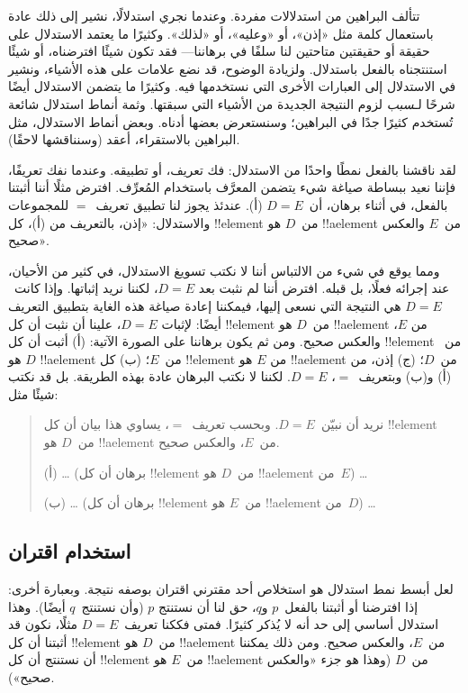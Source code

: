 \documentclass[../../../include/open-logic-section]{subfiles}
\begin{document}


تتألف البراهين من استدلالات مفردة. وعندما نجري استدلالًا، نشير إلى
ذلك عادة باستعمال كلمة مثل «إذن»، أو «وعليه»، أو «لذلك». وكثيرًا ما
يعتمد الاستدلال على حقيقة أو حقيقتين متاحتين لنا سلفًا في برهاننا---
فقد تكون شيئًا افترضناه، أو شيئًا استنتجناه بالفعل باستدلال. ولزيادة
الوضوح، قد نضع علامات على هذه الأشياء، ونشير في الاستدلال إلى
العبارات الأخرى التي نستخدمها فيه. وكثيرًا ما يتضمن الاستدلال أيضًا
شرحًا لـ\emph{سبب} لزوم النتيجة الجديدة من الأشياء التي سبقتها. وثمة
أنماط استدلال شائعة تُستخدم كثيرًا جدًا في البراهين؛ وسنستعرض بعضها
أدناه. وبعض أنماط الاستدلال، مثل البراهين بالاستقراء، أعقد (وسنناقشها
لاحقًا).

لقد ناقشنا بالفعل نمطًا واحدًا من الاستدلال: فك تعريف، أو تطبيقه.
وعندما نفك تعريفًا، فإننا نعيد ببساطة صياغة شيء يتضمن المعرَّف
باستخدام المُعرِّف. افترض مثلًا أننا أثبتنا بالفعل، في أثناء برهان،
أن~$D = E$ (أ). عندئذ يجوز لنا تطبيق تعريف~$=$ للمجموعات والاستدلال:
«إذن، بالتعريف من (أ)، كل !!{element} من~$D$ هو !!a{element} من~$E$
والعكس صحيح».

ومما يوقع في شيء من الالتباس أننا لا نكتب تسويغ الاستدلال، في كثير
من الأحيان، عند إجرائه فعلًا، بل قبله. افترض أننا لم نثبت بعد
$D = E$، لكننا نريد إثباتها. وإذا كانت~$D = E$ هي النتيجة التي نسعى
إليها، فيمكننا إعادة صياغة هذه الغاية بتطبيق التعريف أيضًا: لإثبات
$D = E$، علينا أن نثبت أن كل !!{element} من~$D$ هو !!a{element} من
$E$، والعكس صحيح. ومن ثم يكون برهاننا على الصورة الآتية: (أ) أثبت أن
كل !!{element} من~$D$ هو !!a{element} من~$E$؛ (ب) كل !!{element} من
$E$ هو !!a{element} من~$D$؛ (ج) إذن، من (أ) و(ب) وبتعريف~$=$،
$D = E$. لكننا لا نكتب البرهان عادة بهذه الطريقة. بل قد نكتب شيئًا
مثل:
\begin{quote}
نريد أن نبيّن~$D = E$. وبحسب تعريف~$=$، يساوي هذا بيان أن كل
!!{element} من~$D$ هو !!a{element} من~$E$، والعكس صحيح.

(أ) \dots{} (برهان أن كل !!{element} من~$D$ هو !!a{element} من~$E$)
\dots

(ب) \dots{} (برهان أن كل !!{element} من~$E$ هو !!a{element} من~$D$)
\dots
\end{quote}

\subsection{استخدام اقتران}

لعل أبسط نمط استدلال هو استخلاص أحد مقترني اقتران بوصفه نتيجة.
وبعبارة أخرى: إذا افترضنا أو أثبتنا بالفعل~$p$ و$q$، حق لنا أن نستنتج
$p$ (وأن نستنتج~$q$ أيضًا). وهذا استدلال أساسي إلى حد أنه لا يُذكر
كثيرًا. فمتى فككنا تعريف~$D = E$ مثلًا، نكون قد أثبتنا أن كل
!!{element} من~$D$ هو !!a{element} من~$E$، والعكس صحيح. ومن ذلك
يمكننا أن نستنتج أن كل !!{element} من~$E$ هو !!a{element} من~$D$
(وهذا هو جزء «والعكس صحيح»).
\end{document}
